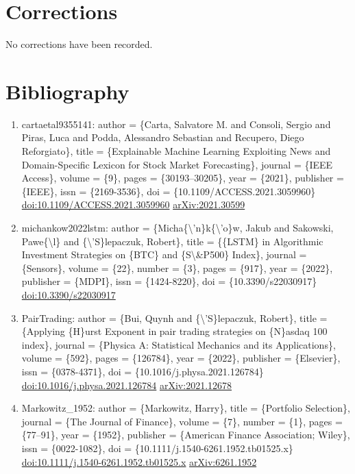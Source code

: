 \documentclass[11pt]{article}
\begin{document}
\section*{Corrections}
No corrections have been recorded.

\section*{Bibliography}
\begin{enumerate}[leftmargin=*]
  \item cartaetal9355141: author = \{Carta, Salvatore M. and Consoli, Sergio and Piras, Luca and Podda, Alessandro Sebastian and Recupero, Diego Reforgiato\}, title = \{Explainable Machine Learning Exploiting News and Domain-Specific Lexicon for Stock Market Forecasting\}, journal = \{IEEE Access\}, volume = \{9\}, pages = \{30193--30205\}, year = \{2021\}, publisher = \{IEEE\}, issn = \{2169-3536\}, doi = \{10.1109/ACCESS.2021.3059960\} \href{https://doi.org/10.1109/ACCESS.2021.3059960}{doi:10.1109/ACCESS.2021.3059960} \href{https://arxiv.org/abs/2021.30599}{arXiv:2021.30599}
  \item michankow2022lstm: author = \{Micha\{\textbackslash{}'n\}k\{\textbackslash{}'o\}w, Jakub and Sakowski, Pawe\{\textbackslash{}l\} and \{\textbackslash{}'S\}lepaczuk, Robert\}, title = \{\{LSTM\} in Algorithmic Investment Strategies on \{BTC\} and \{S\textbackslash{}\&P500\} Index\}, journal = \{Sensors\}, volume = \{22\}, number = \{3\}, pages = \{917\}, year = \{2022\}, publisher = \{MDPI\}, issn = \{1424-8220\}, doi = \{10.3390/s22030917\} \href{https://doi.org/10.3390/s22030917}{doi:10.3390/s22030917}
  \item PairTrading: author = \{Bui, Quynh and \{\textbackslash{}'S\}lepaczuk, Robert\}, title = \{Applying \{H\}urst Exponent in pair trading strategies on \{N\}asdaq 100 index\}, journal = \{Physica A: Statistical Mechanics and its Applications\}, volume = \{592\}, pages = \{126784\}, year = \{2022\}, publisher = \{Elsevier\}, issn = \{0378-4371\}, doi = \{10.1016/j.physa.2021.126784\} \href{https://doi.org/10.1016/j.physa.2021.126784}{doi:10.1016/j.physa.2021.126784} \href{https://arxiv.org/abs/2021.12678}{arXiv:2021.12678}
  \item Markowitz\_1952: author = \{Markowitz, Harry\}, title = \{Portfolio Selection\}, journal = \{The Journal of Finance\}, volume = \{7\}, number = \{1\}, pages = \{77--91\}, year = \{1952\}, publisher = \{American Finance Association; Wiley\}, issn = \{0022-1082\}, doi = \{10.1111/j.1540-6261.1952.tb01525.x\} \href{https://doi.org/10.1111/j.1540-6261.1952.tb01525.x}{doi:10.1111/j.1540-6261.1952.tb01525.x} \href{https://arxiv.org/abs/6261.1952}{arXiv:6261.1952}

\end{enumerate}
\end{document}
